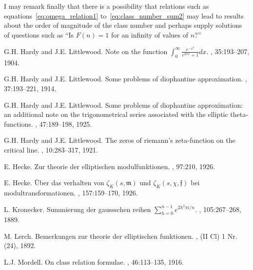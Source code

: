 \documentclass[12pt]{article}
\theoremstyle{remark}
\begin{document}
I may remark finally that there is a possibility that relations such as equations~\eqref{eq:omega_relation1} to~\eqref{eq:class_number_sum2} may lead to results about the order of magnitude of the class number and perhaps supply solutions of questions such as ``Is $F(n) = 1$ for an infinity of values of $n$?''

\begin{thebibliography}{99}

G.H. Hardy and J.E. Littlewood.
\newblock Note on the function $\int_0^\infty \frac{e^{-x^2}}{e^{2\pi x} + 1} dx$.
, 35:193--207, 1904.

G.H. Hardy and J.E. Littlewood.
\newblock Some problems of diophantine approximation.
, 37:193--221, 1914.

G.H. Hardy and J.E. Littlewood.
\newblock Some problems of diophantine approximation: an additional note on the trigonometrical series associated with the elliptic theta-functions.
, 47:189--198, 1925.

G.H. Hardy and J.E. Littlewood.
\newblock The zeros of riemann's zeta-function on the critical line.
, 10:283--317, 1921.

E. Hecke.
\newblock Zur theorie der elliptischen modulfunktionen.
, 97:210, 1926.

E. Hecke.
\newblock \"Uber das verhalten von $\zeta_K(s, \mathfrak{m})$ und $\zeta_K(s, \chi, \mathfrak{f})$ bei modultransformationen.
, 157:159--170, 1926.

L. Kronecker.
\newblock Summierung der gaussschen reihen $\sum_{h=0}^{n-1} e^{2h^2\pi i/n}$.
, 105:267--268, 1889.

M. Lerch.
\newblock Bemerkungen zur theorie der elliptischen funktionen.
, (II Cl) 1 Nr. (24), 1892.

L.J. Mordell.
\newblock On class relation formulae.
, 46:113--135, 1916.


\end{thebibliography}
\end{document}
